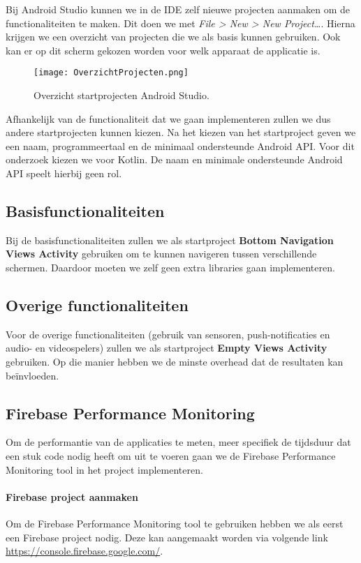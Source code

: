 Bij Android Studio kunnen we in de IDE zelf nieuwe projecten aanmaken om de 
functionaliteiten te maken. Dit doen we met \textit{File > New > New Project\dots}. 
Hierna krijgen we een overzicht van projecten die we als basis kunnen gebruiken. Ook 
kan er op dit scherm gekozen worden voor welk apparaat de applicatie is.
\begin{figure}[H]
    \centering
    \texttt{[image: OverzichtProjecten.png]}
    \caption{Overzicht startprojecten Android Studio.}
\end{figure}
Afhankelijk van de functionaliteit dat we gaan implementeren zullen we dus andere 
startprojecten kunnen kiezen. Na het kiezen van het startproject geven we een naam, 
programmeertaal en de minimaal ondersteunde Android API. Voor dit onderzoek kiezen we 
voor Kotlin. De naam en minimale ondersteunde Android API speelt hierbij geen rol.

\subsection{Basisfunctionaliteiten}
\label{par:basisfunctionaliteiten}
Bij de basisfunctionaliteiten zullen we als startproject 
\textbf{Bottom Navigation Views Activity} gebruiken om te kunnen navigeren tussen 
verschillende schermen. Daardoor moeten we zelf geen extra libraries gaan implementeren.

\subsection{Overige functionaliteiten}
Voor de overige functionaliteiten (gebruik van sensoren, 
push-notificaties en audio- en videospelers) zullen we als startproject 
\textbf{Empty Views Activity} gebruiken. Op die manier hebben we de minste \gls{overhead} 
dat de resultaten kan beïnvloeden.

\subsection{Firebase Performance Monitoring}
Om de performantie van de applicaties te meten, meer specifiek de tijdsduur dat een stuk code nodig heeft om uit te voeren 
gaan we de Firebase Performance Monitoring tool in het project implementeren. 

\paragraph{Firebase project aanmaken}
Om de Firebase Performance Monitoring tool te gebruiken hebben we als eerst een Firebase project nodig.
Deze kan aangemaakt worden via volgende link \url{https://console.firebase.google.com/}.

